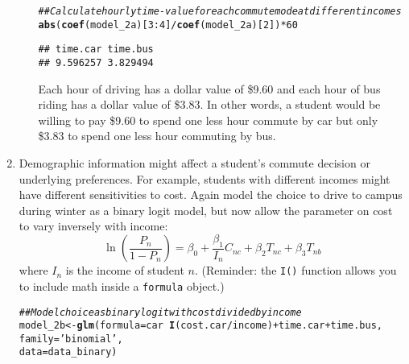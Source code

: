 \documentclass[11pt,letterpaper]{article}\usepackage[]{graphicx}\usepackage[]{color}
\makeatletter
\newcommand{\hlnum}[1]{\textcolor[rgb]{0.686,0.059,0.569}{#1}}%
\newcommand{\hlstr}[1]{\textcolor[rgb]{0.192,0.494,0.8}{#1}}%
\newcommand{\hlcom}[1]{\textcolor[rgb]{0.678,0.584,0.686}{\textit{#1}}}%
\newcommand{\hlopt}[1]{\textcolor[rgb]{0,0,0}{#1}}%
\newcommand{\hlstd}[1]{\textcolor[rgb]{0.345,0.345,0.345}{#1}}%
\newcommand{\hlkwb}[1]{\textcolor[rgb]{0.69,0.353,0.396}{#1}}%
\newcommand{\hlkwc}[1]{\textcolor[rgb]{0.333,0.667,0.333}{#1}}%
\newcommand{\hlkwd}[1]{\textcolor[rgb]{0.737,0.353,0.396}{\textbf{#1}}}%
\newenvironment{kframe}{%
 \def\at@end@of@kframe{}%
 \ifinner\ifhmode%
  \def\at@end@of@kframe{\end{minipage}}%
  \begin{minipage}{\columnwidth}%
 \fi\fi%
 \def\FrameCommand##1{\hskip\@totalleftmargin \hskip-\fboxsep
 \colorbox{shadecolor}{##1}\hskip-\fboxsep
     \hskip-\linewidth \hskip-\@totalleftmargin \hskip\columnwidth}%
 \MakeFramed {\advance\hsize-\width
   \@totalleftmargin\z@ \linewidth\hsize
   \@setminipage}}%
 {\par\unskip\endMakeFramed%
 \at@end@of@kframe}
\newenvironment{knitrout}{}{} %
\makeatother
\begin{document}
\begin{enumerate}[label=\alph*., leftmargin=*]
\begin{enumerate}[label=\roman*.]
\begin{knitrout}
\color{fgcolor}\begin{kframe}
\begin{alltt}
\hlcom{## Calculate hourly time-value for each commute mode at different incomes}
\hlkwd{abs}\hlstd{(}\hlkwd{coef}\hlstd{(model_2a)[}\hlnum{3}\hlopt{:}\hlnum{4}\hlstd{]} \hlopt{/} \hlkwd{coef}\hlstd{(model_2a)[}\hlnum{2}\hlstd{])} \hlopt{*} \hlnum{60}
\end{alltt}
\begin{verbatim}
## time.car time.bus 
## 9.596257 3.829494
\end{verbatim}
\end{kframe}
\end{knitrout}

		Each hour of driving has a dollar value of \$9.60 and each hour of bus riding has a dollar value of \$3.83. In other words, a student would be willing to pay \$9.60 to spend one less hour commute by car but only \$3.83 to spend one less hour commuting by bus.
	\end{enumerate}

	\item Demographic information might affect a student's commute decision or underlying preferences. For example, students with different incomes might have different sensitivities to cost. Again model the choice to drive to campus during winter as a binary logit model, but now allow the parameter on cost to vary inversely with income:
	$$\ln \left( \frac{P_n}{1 - P_n} \right) = \beta_0 + \frac{\beta_1}{I_n} C_{nc} + \beta_2 T_{nc} + \beta_3 T_{nb}$$
	where $I_n$ is the income of student $n$. (Reminder: the \texttt{I()} function allows you to include math inside a \texttt{formula} object.)

\begin{knitrout}
\color{fgcolor}\begin{kframe}
\begin{alltt}
\hlcom{## Model choice as binary logit with cost divided by income}
\hlstd{model_2b} \hlkwb{<-} \hlkwd{glm}\hlstd{(}\hlkwc{formula} \hlstd{= car} \hlopt{~} \hlkwd{I}\hlstd{(cost.car} \hlopt{/} \hlstd{income)} \hlopt{+} \hlstd{time.car} \hlopt{+} \hlstd{time.bus,}
                \hlkwc{family} \hlstd{=} \hlstr{'binomial'}\hlstd{,}
                \hlkwc{data} \hlstd{= data_binary)}
\end{alltt}
\end{kframe}
\end{knitrout}


\end{enumerate}
\end{document}
